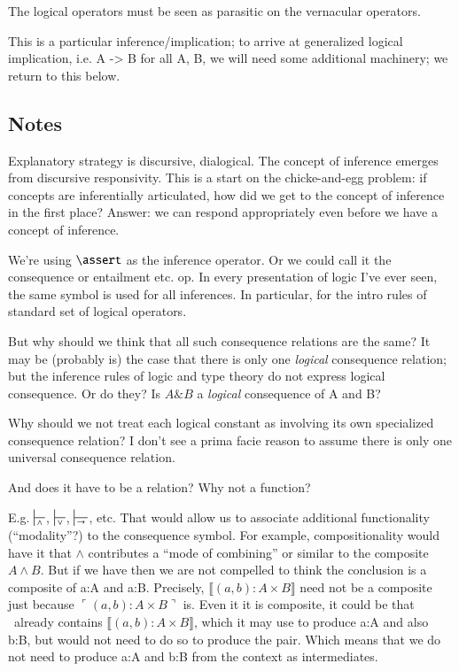 \documentclass{article}
\begin{document}
The logical operators must be seen as parasitic on the vernacular
operators.

This is a particular inference/implication; to arrive at
generalized logical implication, i.e. A -> B for all A, B, we will need some additional machinery; we return to this below.


\subsection{Notes}

Explanatory strategy is discursive, dialogical. The concept of
inference emerges from discursive responsivity. This is a start on the
chicke-and-egg problem: if concepts are inferentially articulated, how
did we get to the concept of inference in the first place? Answer: we
can respond appropriately even before we have a concept of inference.


We're using \(\linfer\) as the inference operator. Or we could call it
the consequence or entailment etc. op. In every presentation of logic
I've ever seen, the same symbol is used for all inferences. In
particular, for the intro rules of standard set of logical operators.

But why should we think that all such consequence relations are the
same? It may be (probably is) the case that there is only one
\textit{logical} consequence relation; but the inference rules of
logic and type theory do not express logical consequence. Or do
they? Is \(A\&B\) a \textit{logical} consequence of A and B?

Why should we not treat each logical constant as involving its own
specialized consequence relation?  I don't see a prima facie reason to
assume there is only one universal consequence relation.

And does it have to be a relation? Why not a function?

E.g. \(\sststile{\land}{}\), \(\sststile{\lor}{}\),
\(\sststile{\rightarrow}{}\), etc. That would allow us to associate
additional functionality (``modality''?) to the consequence symbol.
For example, compositionality would have it that \(\land\) contributes
a ``mode of combining'' or similar to the composite \(A\land B\). But
if we have
then we are not compelled to think the
conclusion is a composite of a:A and a:B. Precisely, \(\llbracket
(a,b): A\times B\rrbracket\) need not be a composite just because
\(\ulcorner (a,b): A\times B\urcorner\) is. Even it it is composite,
it could be that \ContextG\ already contains \(\llbracket (a,b):
A\times B\rrbracket\), which it may use to produce a:A and also b:B,
but would not need to do so to produce the pair. Which means that we
do not need to produce a:A and b:B from the context as intermediates.
\end{document}

